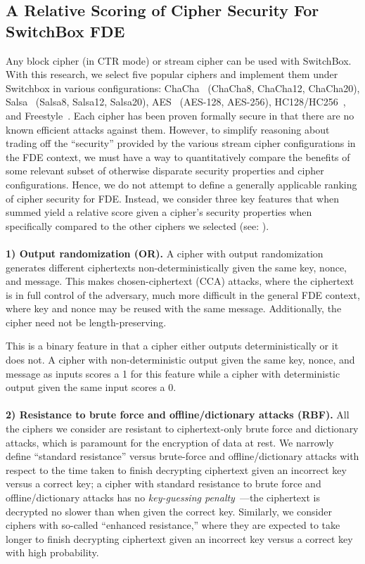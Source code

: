 \subsection{A Relative Scoring of Cipher Security For SwitchBox FDE}

Any block cipher (in CTR mode) or stream cipher can be used with SwitchBox. With
this research, we select five popular ciphers and implement them under Switchbox
in various configurations: ChaCha~\cite{ChaCha20} (ChaCha8, ChaCha12, ChaCha20),
Salsa~\cite{SalsaX} (Salsa8, Salsa12, Salsa20), AES~\cite{AES} (AES-128,
AES-256), HC128/HC256~\cite{HCX}, and Freestyle~\cite{Freestyle}. Each cipher
has been proven formally secure in that there are no known efficient attacks
against them. However, to simplify reasoning about trading off the ``security''
provided by the various stream cipher configurations in the FDE context, we must
have a way to quantitatively compare the benefits of some relevant subset of
otherwise disparate security properties and cipher configurations. Hence, we do
not attempt to define a generally applicable ranking of cipher security for FDE.
Instead, we consider three key features that when summed yield a relative score
given a cipher's security properties when specifically compared to the other
ciphers we selected (see: ).\\
\\
\textbf{1) Output randomization (OR).} A cipher with output randomization
generates different ciphertexts non-deterministically given the same key,
nonce, and message. This makes chosen-ciphertext (CCA) attacks, where the
ciphertext is in full control of the adversary, much more difficult in the
general FDE context, where key and nonce may be reused with the same message.
Additionally, the cipher need not be length-preserving.

This is a binary feature in that a cipher either outputs deterministically or
it does not. A cipher with non-deterministic output given the same key, nonce,
and message as inputs scores a 1 for this feature while a cipher with
deterministic output given the same input scores a 0.\\
\\
\textbf{2) Resistance to brute force and offline/dictionary attacks (RBF).}
All the ciphers we consider are resistant to ciphertext-only brute force and
dictionary attacks, which is paramount for the encryption of data at rest. We
narrowly define ``standard resistance'' versus brute-force and
offline/dictionary attacks with respect to the time taken to finish decrypting
ciphertext given an incorrect key versus a correct key; a cipher with standard
resistance to brute force and offline/dictionary attacks has no
\emph{key-guessing penalty}~\cite{Freestyle}---the ciphertext is decrypted no
slower than when given the correct key. Similarly, we consider ciphers with
so-called ``enhanced resistance,'' where they are expected to take longer to
finish decrypting ciphertext given an incorrect key versus a correct key with
high probability.

